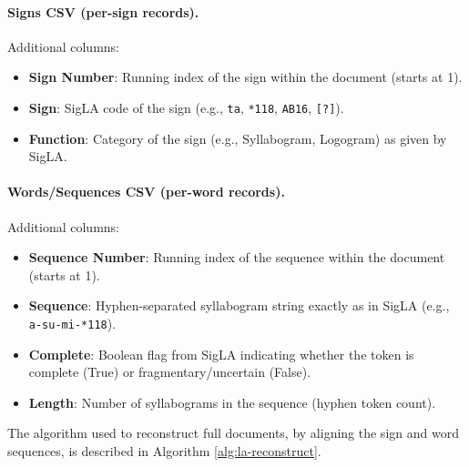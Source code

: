 \paragraph{Signs CSV (per-sign records).}
Additional columns:

\begin{itemize}
  \item \textbf{Sign Number}: Running index of the sign within the document (starts at 1).
  \item \textbf{Sign}:  SigLA code of the sign (e.g., \texttt{ta}, \texttt{*118}, \texttt{AB16}, \texttt{[?]}).
  \item \textbf{Function}: Category of the sign (e.g., Syllabogram, Logogram) as given by  SigLA.
\end{itemize}

\paragraph{Words/Sequences CSV (per-word records).}
Additional columns:

\begin{itemize}
  \item \textbf{Sequence Number}: Running index of the sequence within the document (starts at 1).
  \item \textbf{Sequence}: Hyphen-separated syllabogram string exactly as in  SigLA (e.g., \texttt{a-su-mi-*118}).
  \item \textbf{Complete}: Boolean flag from  SigLA indicating whether the token is complete (True) or fragmentary/uncertain (False).
  \item \textbf{Length}: Number of syllabograms in the sequence (hyphen token count).
\end{itemize}

The algorithm used to reconstruct full documents, by aligning the sign and word sequences, is described in Algorithm \ref{alg:la-reconstruct}.

